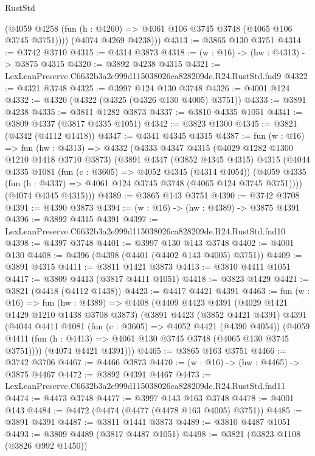 \begin{lexlean}{RustStd}
\begin{coremodule}
          (@4059 @4258 (fun (h : @4260) => @4061 @106 @3745 @3748 (@4065 @106 @3745 @3751))))
        (@4074 @4269 @4238)))
@4313 := @3865 @130 @3751
@4314 := @3742 @3710
@4315 := @4314 @3873
@4318 := (w : @16) -> (hw : @4313) -> @3875 @4315
@4320 := @3892 @4238 @4315
@4321 := LexLeanPreserve.C6632b3a2e999d115038026ca828209de.R24.RustStd.fnd9
@4322 := @4321 @3748
@4325 := @3997 @124 @130 @3748
@4326 := @4001 @124
@4332 := @4320 (@4322 (@4325 (@4326 @130 @4005) @3751))
@4333 := @3891 @4238
@4335 := @3811 @1282 @3873
@4337 := @3810 @4335 @1051
@4341 := @3809 @4337 (@3817 @4335 @1051)
@4342 := @3823 @1300
@4345 := @3821 (@4342 (@4112 @1418))
@4347 := @4341 @4345 @4315
@4387 := fun (w : @16) =>
  fun (hw : @4313) =>
  @4332
    (@4333
      @4347
      @4315
      (@4029 @1282 @1300 @1210 @1418 @3710 @3873)
      (@3891
        @4347
        (@3852 @4345 @4315)
        @4315
        (@4044
          @4335
          @1081
          (fun (c : @3605) => @4052 @4345 (@4314 @4054))
          (@4059 @4335 (fun (h : @4337) => @4061 @124 @3745 @3748 (@4065 @124 @3745 @3751))))
        (@4074 @4345 @4315)))
@4389 := @3865 @143 @3751
@4390 := @3742 @3708
@4391 := @4390 @3873
@4394 := (w : @16) -> (hw : @4389) -> @3875 @4391
@4396 := @3892 @4315 @4391
@4397 := LexLeanPreserve.C6632b3a2e999d115038026ca828209de.R24.RustStd.fnd10
@4398 := @4397 @3748
@4401 := @3997 @130 @143 @3748
@4402 := @4001 @130
@4408 := @4396 (@4398 (@4401 (@4402 @143 @4005) @3751))
@4409 := @3891 @4315
@4411 := @3811 @1421 @3873
@4413 := @3810 @4411 @1051
@4417 := @3809 @4413 (@3817 @4411 @1051)
@4418 := @3823 @1429
@4421 := @3821 (@4418 (@4112 @1438))
@4423 := @4417 @4421 @4391
@4463 := fun (w : @16) =>
  fun (hw : @4389) =>
  @4408
    (@4409
      @4423
      @4391
      (@4029 @1421 @1429 @1210 @1438 @3708 @3873)
      (@3891
        @4423
        (@3852 @4421 @4391)
        @4391
        (@4044
          @4411
          @1081
          (fun (c : @3605) => @4052 @4421 (@4390 @4054))
          (@4059 @4411 (fun (h : @4413) => @4061 @130 @3745 @3748 (@4065 @130 @3745 @3751))))
        (@4074 @4421 @4391)))
@4465 := @3865 @163 @3751
@4466 := @3742 @3706
@4467 := @4466 @3873
@4470 := (w : @16) -> (hw : @4465) -> @3875 @4467
@4472 := @3892 @4391 @4467
@4473 := LexLeanPreserve.C6632b3a2e999d115038026ca828209de.R24.RustStd.fnd11
@4474 := @4473 @3748
@4477 := @3997 @143 @163 @3748
@4478 := @4001 @143
@4484 := @4472 (@4474 (@4477 (@4478 @163 @4005) @3751))
@4485 := @3891 @4391
@4487 := @3811 @1441 @3873
@4489 := @3810 @4487 @1051
@4493 := @3809 @4489 (@3817 @4487 @1051)
@4498 := @3821 (@3823 @1108 (@3826 @992 @1450))

\end{coremodule}
\end{lexlean}
